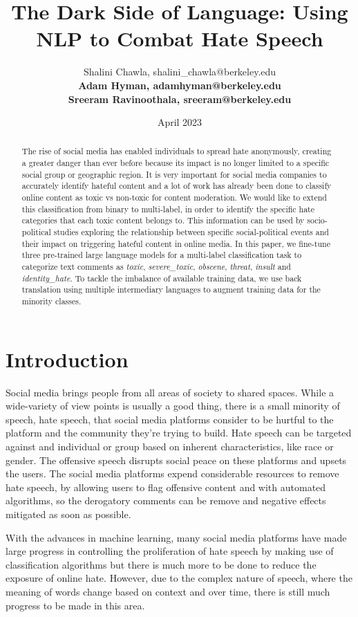 \documentclass[11pt,a4paper]{article}
\title{The Dark Side of Language: Using NLP to Combat Hate Speech}
\author{ 
  Shalini Chawla, shalini\_chawla@berkeley.edu
  \\[2ex]
  \textbf{Adam Hyman, adamhyman@berkeley.edu}
  \\[2ex]
  \textbf{Sreeram Ravinoothala, sreeram@berkeley.edu} 
  }
\date{April 2023}
\begin{document}
\maketitle
\begin{abstract}
The rise of social media has enabled individuals to spread hate anonymously, creating a greater danger than ever before because its impact is no longer limited to a specific social group or geographic region. It is very important for social media companies to accurately identify hateful content and a lot of work has already been done to classify online content as toxic vs non-toxic for content moderation. We would like to extend this classification from binary to multi-label, in order to identify the specific hate categories that each toxic content belongs to. This information can be used by socio-political studies exploring the relationship between specific social-political events and their impact on triggering hateful content in online media. In this paper, we fine-tune three pre-trained large language models for a multi-label classification task to categorize text comments as \emph{toxic}, \emph{severe\_toxic}, \emph{obscene}, \emph{threat}, \emph{insult} and \emph{identity\_hate}. To tackle the imbalance of available training data, we use back translation using multiple intermediary languages to augment training data for the minority classes.

\end{abstract}

\section{Introduction}

Social media brings people from all areas of society to shared spaces.  While a wide-variety of view points is usually a good thing, there is a small minority of speech, hate speech, that social media platforms consider to be hurtful to the platform and the community they're trying to build.  Hate speech can be targeted against and individual or group based on inherent characteristics, like race or gender.  The offensive speech disrupts social peace on these platforms and upsets the users.  The social media platforms expend considerable resources to remove hate speech, by allowing users to flag offensive content and with automated algorithms, so the derogatory comments can be remove and negative effects mitigated as soon as possible.

With the advances in machine learning, many social media platforms have made large progress in controlling the proliferation of hate speech by making use of classification algorithms but there is much more to be done to reduce the exposure of online hate.  However, due to the complex nature of speech, where the meaning of words change based on context and over time, there is still much progress to be made in this area.
\end{document}
